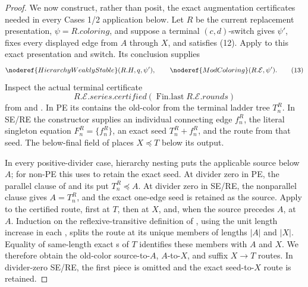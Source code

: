 \begin{proof}
We now construct, rather than posit, the exact augmentation certificates
needed in every Cases 1/2 application below.  Let \(R\) be the current
replacement presentation, \(\psi=R.\mathit{coloring}\), and suppose a
terminal \((c,d)\)-switch gives \(\psi'\), fixes every displayed edge
from \(A\) through \(X\), and satisfies (12).  Apply
 to this exact presentation and switch.
Its conclusion supplies
\[
 \noderef{HierarchyWeaklyStable}(R.H,q,\psi'),\qquad
 \noderef{ModColoring}(R.\mathcal E,\psi').                  \tag{13}
\]
Inspect the actual terminal certificate
\[
 R.\mathcal E.\mathit{series}.\mathit{certified}
       (\operatorname{Fin.last}R.\mathcal E.\mathit{rounds})
\]
from  and
.  In PE its
 contains the old-color
 from the terminal ladder tree
\(T_n^R\).  In SE/RE the constructor supplies an individual connecting
edge \(f_n^R\), the literal singleton equation \(F_n^R=\{f_n^R\}\), an
exact  seed \(T_n^R+f_n^R\), and the
route from that seed.  The below-final field of
 places \(X\preccurlyeq T\) below its
output.

In every positive-divider case, hierarchy nesting puts the applicable
source below \(A\); for non-PE this uses
 to retain the exact seed.  At
divider zero in PE, the parallel clause of  and
its  put \(T_n^R\preccurlyeq A\).  At divider
zero in SE/RE, the nonparallel clause gives \(A=T_n^R\), and the exact
one-edge seed is retained as the source.  Apply
 to the certified route,
first at \(T\), then at \(X\), and, when the source precedes \(A\), at
\(A\).  Induction on the reflexive-transitive definition of
, using the unit length increase
in each , splits the route at its unique
members of lengths \(|A|\) and \(|X|\).  Equality of same-length exact
s of \(T\) identifies these members
with \(A\) and \(X\).  We
therefore obtain the old-color source-to-\(A\), \(A\)-to-\(X\), and
suffix \(X\longrightarrow T\) routes.  In divider-zero SE/RE, the first
piece is omitted and the exact seed-to-\(X\) route is retained.


\end{proof}
